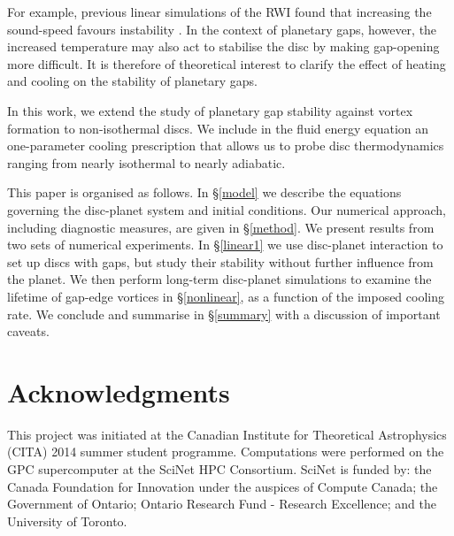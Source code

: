\documentclass[useAMS,usenatbib]{mn2e}
\begin{document}
For example, previous
linear simulations of the RWI found  
that increasing the sound-speed favours instability \citep{li00,lin13}.  
In the context of
planetary gaps, however, the increased temperature may also act to
stabilise the disc by making gap-opening more difficult. It is 
therefore of theoretical interest to clarify the effect of heating and
cooling on the stability of planetary gaps. 

In this work, we extend the study of planetary gap stability against
vortex formation to non-isothermal discs. We include in the fluid energy
equation an one-parameter cooling prescription that allows us to probe
disc thermodynamics ranging from nearly isothermal to nearly
adiabatic.      

This paper is organised as follows. In \S\ref{model} we describe the
equations governing the disc-planet system and initial conditions. Our
numerical approach, including diagnostic measures, are given in
\S\ref{method}. We present results from two sets of numerical
experiments. In \S\ref{linear1} we use disc-planet interaction to set
up discs with gaps, but study their stability without further
influence from the planet. %
We then perform long-term disc-planet simulations to examine the
lifetime of gap-edge vortices in \S\ref{nonlinear},  
as a function of the imposed cooling rate. We conclude and summarise
in \S\ref{summary} with a discussion of important caveats. 





%


\section*{Acknowledgments}
This project was initiated at the Canadian Institute for Theoretical
Astrophysics (CITA) 2014 summer student programme.  
Computations were performed on the GPC supercomputer at the
SciNet HPC Consortium. SciNet is funded by: the Canada Foundation for
Innovation under the auspices of Compute Canada; the Government of
Ontario; Ontario Research Fund - Research Excellence; and the
University of Toronto.   




\appendix
%
%
\end{document}
